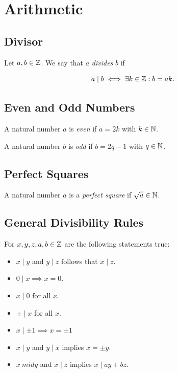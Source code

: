 \chapter{Arithmetic}

\section{Divisor}

Let \(a,b \in \mathbb{Z}\). We say that \(a\) \emph{divides} \(b\) if

\[
	a \mid b \iff \exists k \in \mathbb{Z} : b = ak.
\]

\section{Even and Odd Numbers}

A natural number \(a\) is \emph{even} if \(a = 2k\) with \(k \in \mathbb{N}\).

A natural number \(b\) is \emph{odd} if \(b = 2q - 1\) with \(q \in \mathbb{N}\).

\section{Perfect Squares}

A natural number \(a\) is a \emph{perfect square} if \(\sqrt{a} \in \mathbb{N}\).

\section{General Divisibility Rules}

For \(x, y, z, a, b \in \mathbb{Z}\) are the following statements true:

\begin{itemize}

	\item \(x \mid y\) and \(y \mid z\) follows that \(x \mid z\).

	\item \(0 \mid x \implies x = 0\).

	\item \(x \mid 0\) for all \(x\).

	\item \(\pm \mid x\) for all \(x\).

	\item \(x \mid \pm 1 \implies x = \pm 1\)

	\item \(x \mid y\) and \(y \mid x\) implies \(x = \pm y\).

	\item \(x\ mid y\) and \(x \mid z\) implies \(x \mid ay + b z\).

\end{itemize}

